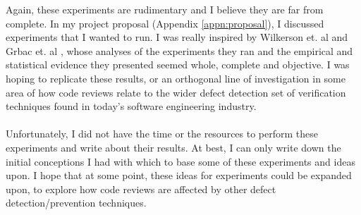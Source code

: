 Again, these experiments are rudimentary and I believe they are far from complete.
In my project proposal (Appendix \ref{appn:proposal}), I discussed experiments that I wanted to run.
I was really inspired by Wilkerson et. al \cite{wilkerson2012comparing} and Grbac et. al
\cite{grbac2012quantifying}, whose analyses of the experiments they ran and the empirical and
statistical evidence they presented seemed whole, complete and objective.
I was hoping to replicate these results, or an orthogonal line of investigation in some area of how
code reviews relate to the wider defect detection set of verification techniques found in today's
software engineering industry.\\
\\
Unfortunately, I did not have the time or the resources to perform these experiments and write about
their results.
At best, I can only write down the initial conceptions I had with which to base some of these
experiments and ideas upon.
I hope that at some point, these ideas for experiments could be expanded upon, to explore how code reviews are
affected by other defect detection/prevention techniques.
